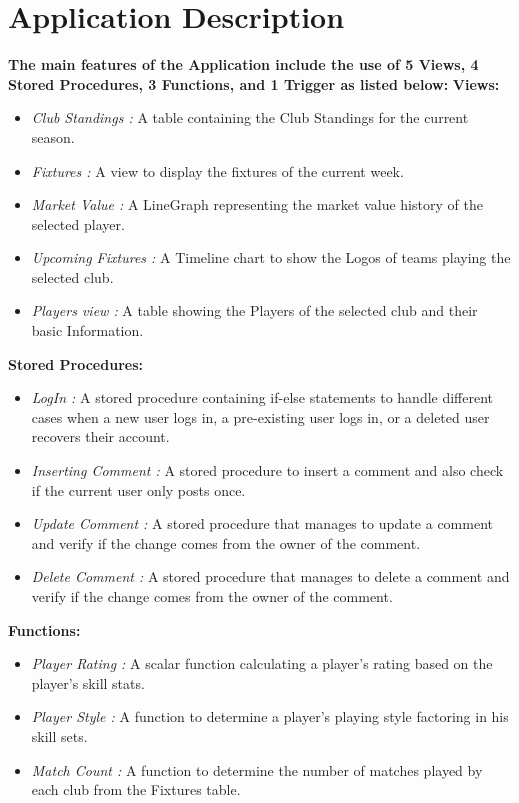 \documentclass[letterpaper]{article}
\begin{document}
\section{Application Description}
\noindent\textbf{The main features of the Application include the use of 5 Views, 4 Stored Procedures, 3 Functions, and 1 Trigger as listed below:}  
\newline
\newline
\textbf{Views:} 

\begin{itemize}
    \item \textit{Club Standings :} A table containing the Club Standings for the current season.
    \item \textit{Fixtures : }A view to display the fixtures of the current week.
    \item \textit{Market Value :} A LineGraph representing the market value history of the selected player.
    \item \textit{Upcoming Fixtures : }A Timeline chart to show the Logos of teams playing the selected club.
    \item \textit{Players view : }A table showing the Players of the selected club and their basic Information.
\end{itemize}

 \noindent\textbf{Stored Procedures:} 

\begin{itemize}
    \item \textit{LogIn :} A stored procedure containing if-else statements to handle different cases when a new user logs in, a pre-existing user logs in, or a deleted user recovers their account.
    \item \textit{Inserting Comment :} A stored procedure to insert a comment and also check if the current user only posts once.
    \item \textit{Update Comment : }A stored procedure that manages to update a comment and verify if the change comes from the owner of the comment.
    \item \textit{Delete Comment :} A stored procedure that manages to delete a comment and verify if the change comes from the owner of the comment.
\end{itemize}

 \noindent\textbf{Functions:} 

\begin{itemize}
    \item \textit{Player Rating : }A scalar function calculating a player's rating based on the player's skill stats.
    \item \textit{Player Style :} A function to determine a player's playing style factoring in his skill sets.
    \item \textit{Match Count : }A function to determine the number of matches played by each club from the Fixtures table.
\end{itemize}
\end{document}
